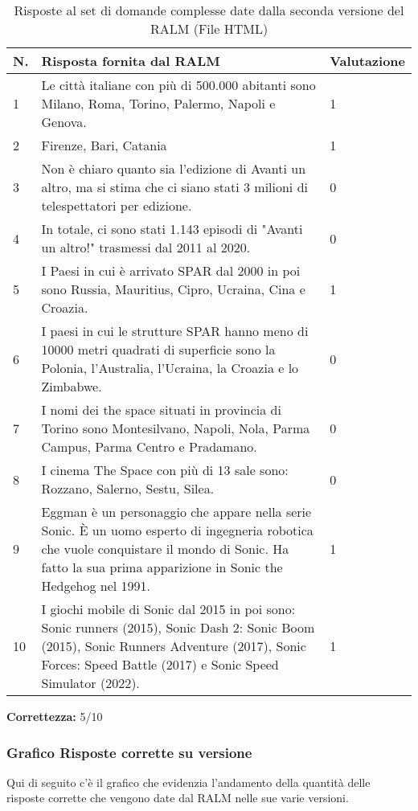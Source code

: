 \begin{table}[H]
    \centering
    \begin{tabular}{|p{0.5cm} |p{6cm} |p{2cm}|}
        \hline
        \textbf{N}. & \textbf{Risposta fornita dal RALM} & \textbf{Valutazione} \\
        \hline
        1 & Le città italiane con più di 500.000 abitanti sono Milano, Roma, Torino, Palermo, Napoli e Genova. & 1 \\
        \hline
        2 & Firenze, Bari, Catania & 1 \\
        \hline
        3 & Non è chiaro quanto sia l'edizione di Avanti un altro, ma si stima che ci siano stati 3 milioni di telespettatori per edizione. & 0 \\
        \hline
        4 & In totale, ci sono stati 1.143 episodi di "Avanti un altro!" trasmessi dal 2011 al 2020. & 0 \\
        \hline
        5 & I Paesi in cui è arrivato SPAR dal 2000 in poi sono Russia, Mauritius, Cipro, Ucraina, Cina e Croazia. & 1 \\
        \hline
        6 & I paesi in cui le strutture SPAR hanno meno di 10000 metri quadrati di superficie sono la Polonia, l'Australia, l'Ucraina, la Croazia e lo Zimbabwe. & 0 \\
        \hline
        7 & I nomi dei the space situati in provincia di Torino sono Montesilvano, Napoli, Nola, Parma Campus, Parma Centro e Pradamano. & 0 \\
        \hline
        8 & I cinema The Space con più di 13 sale sono: Rozzano, Salerno, Sestu, Silea. & 0 \\
        \hline
        9 & Eggman è un personaggio che appare nella serie Sonic. È un uomo esperto di ingegneria robotica che vuole conquistare il mondo di Sonic. Ha fatto la sua prima apparizione in Sonic the Hedgehog nel 1991.  & 1 \\
        \hline
        10 & I giochi mobile di Sonic dal 2015 in poi sono: Sonic runners (2015), Sonic Dash 2: Sonic Boom (2015), Sonic Runners Adventure (2017), Sonic Forces: Speed Battle (2017) e Sonic Speed Simulator (2022). & 1 \\
        \hline
    \end{tabular}
    \caption{Risposte al set di domande complesse date dalla seconda versione del RALM (File HTML)}
\end{table}

\textbf{Correttezza:} 5/10

\subsubsection{Grafico Risposte corrette su versione}
Qui di seguito c'è il grafico che evidenzia l'andamento della quantità delle risposte corrette che vengono date dal RALM nelle sue varie versioni.


